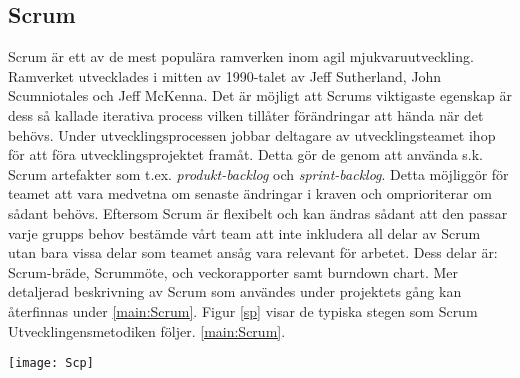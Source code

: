 \subsection{Scrum}
Scrum är ett av de mest populära ramverken inom agil mjukvaruutveckling. Ramverket utvecklades i mitten av 1990-talet av Jeff Sutherland, John Scumniotales och Jeff McKenna. Det är möjligt att Scrums viktigaste egenskap är dess så kallade iterativa process vilken tillåter förändringar att hända när det behövs. Under utvecklingsprocessen jobbar deltagare av utvecklingsteamet ihop för att föra utvecklingsprojektet framåt. Detta gör de genom att använda s.k.  Scrum artefakter som t.ex. \textit{produkt-backlog} och \textit{sprint-backlog}. Detta möjliggör för teamet att vara medvetna om senaste ändringar i kraven och omprioriterar om sådant behövs.  \cite{aamir2017incorporating} Eftersom Scrum är flexibelt och kan ändras sådant att den passar varje grupps behov bestämde vårt team att inte inkludera all delar av Scrum utan bara vissa delar som teamet ansåg vara relevant för arbetet. Dess delar är: Scrum-bräde, Scrummöte, och veckorapporter samt burndown chart. Mer detaljerad beskrivning av Scrum som användes under projektets gång kan återfinnas under \ref{main:Scrum}. Figur \ref{sp} visar de typiska stegen som Scrum Utvecklingensmetodiken följer.
\ref{main:Scrum}.
\begin{figure*}[h]
	\centering
	\texttt{[image: Scp]}
	\caption{De typiska stegen som följs i Scrum\cite{Scrumprocess}}
	\label{sp}
\end{figure*}
\newpage